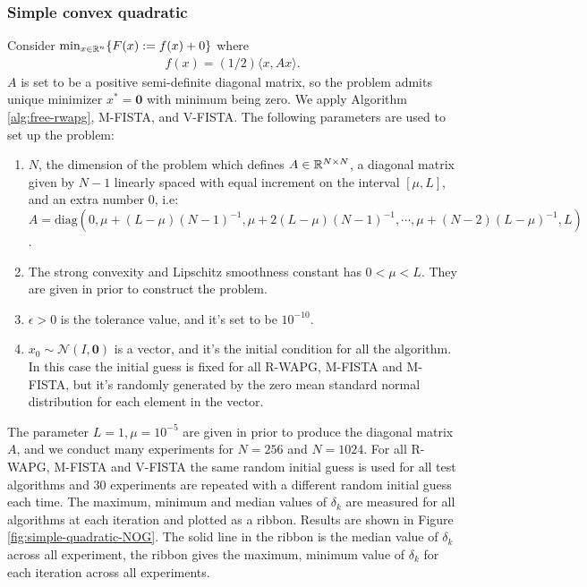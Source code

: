 \documentclass[12pt]{article}
\begin{document}
        \subsubsection{Simple convex quadratic}
            Consider $\min_{x \in \mathbb R^n} \{F(x):= f(x) + 0\}$ where 
            \begin{align*}
                f(x) = (1/2)\langle x, A x\rangle. 
            \end{align*}
            $A$ is set to be a positive semi-definite diagonal matrix, so the problem admits unique minimizer $x^* = \mathbf 0$ with minimum being zero. 
            We apply Algorithm \ref{alg:free-rwapg}, M-FISTA, and V-FISTA. 
            The following parameters are used to set up the problem: 
            \begin{enumerate}
                \item $N$, the dimension of the problem which defines $A \in \mathbb R^{N\times N}$, a diagonal matrix given by $N- 1$ linearly spaced with equal increment on the interval $[\mu, L]$, and an extra number $0$, i.e: $A = \text{diag}(0, \mu + (L-\mu)(N - 1)^{-1}, \mu + 2(L-\mu)(N - 1)^{-1}, \cdots, \mu + (N - 2)(L - \mu)^{-1}, L)$. 
                \item The strong convexity and Lipschitz smoothness constant has $0 < \mu < L$. They are given in prior to construct the problem. 
                \item $\epsilon > 0$ is the tolerance value, and it's set to be $10^{-10}$. 
                \item $x_0 \sim \mathcal N(I, \mathbf 0)$ is a vector, and it's the initial condition for all the algorithm. In this case the initial guess is fixed for all R-WAPG, M-FISTA and M-FISTA, but it's randomly generated by the zero mean standard normal distribution for each element in the vector. 
            \end{enumerate}
            The parameter $L=1, \mu=10^{-5}$ are given in prior to produce the diagonal matrix $A$, and we conduct many experiments for $N = 256$ and $N = 1024$. 
            For all R-WAPG, M-FISTA and V-FISTA the same random initial guess is used for all test algorithms and 30 experiments are repeated with a different random initial guess each time. 
            The maximum, minimum and median values of $\delta_k$ are measured for all algorithms at each iteration and plotted as a ribbon. 
            Results are shown in Figure \ref{fig:simple-quadratic-NOG}.
            The solid line in the ribbon is the median value of $\delta_k$ across all experiment, the ribbon gives the maximum, minimum value of $\delta_k$ for each iteration across all experiments. 
\end{document}
